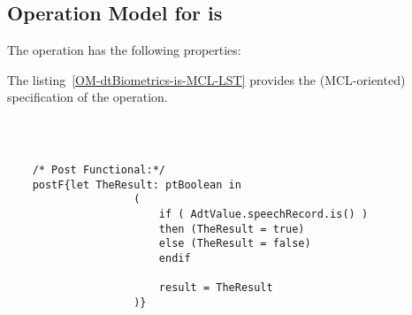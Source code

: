 \subsection{Operation Model for is}

\label{OM-is}


The  operation has the following properties:

	\begin{operationmodel}



		


	\end{operationmodel}



	\vspace{1cm}
	The listing~\ref{OM-dtBiometrics-is-MCL-LST} provides the \msrmessir (MCL-oriented) specification of the operation.
	
	\scriptsize
	\vspace{0.5cm}
	\begin{lstlisting}[style=MessirStyle,firstnumber=auto,captionpos=b,caption={\msrmessir (MCL-oriented) specification of the operation \emph{is}.},label=OM-dtBiometrics-is-MCL-LST]

	
	
	/* Post Functional:*/ 
	postF{let TheResult: ptBoolean in
					(
						if ( AdtValue.speechRecord.is() )
				        then (TheResult = true)
				        else (TheResult = false)
				        endif
				        
				        result = TheResult
					)}
	
	
	\end{lstlisting}
	\normalsize 
	
	
	
	





